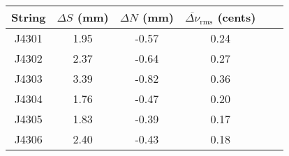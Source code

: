 \begin{tabular}{cccccc}
\toprule
String & $\Delta S$ (mm) & $\Delta N$ (mm) & $\overline{\Delta \nu}_\text{rms}$ (cents) \\
\midrule
J4301 & 1.95 & -0.57 & 0.24 \\
J4302 & 2.37 & -0.64 & 0.27 \\
J4303 & 3.39 & -0.82 & 0.36 \\
J4304 & 1.76 & -0.47 & 0.20 \\
J4305 & 1.83 & -0.39 & 0.17 \\
J4306 & 2.40 & -0.43 & 0.18 \\
\bottomrule
\end{tabular}

